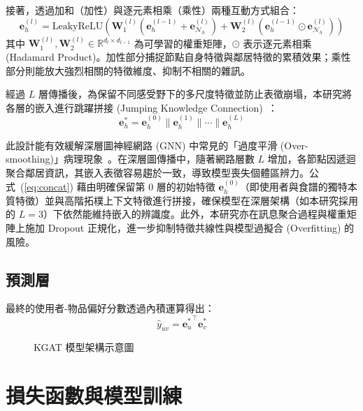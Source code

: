 接著，透過加和（加性）與逐元素相乘（乘性）兩種互動方式組合：
\begin{equation}
  \bm{e}_h^{(l)} = \text{LeakyReLU}\left(\bm{W}_1^{(l)} \left(\bm{e}_h^{(l-1)} + \bm{e}_{\mathcal{N}_h}^{(l)}\right) + \bm{W}_2^{(l)} \left(\bm{e}_h^{(l-1)} \odot \bm{e}_{\mathcal{N}_h}^{(l)}\right)\right)
  \label{eq:bi_interaction}
\end{equation}
其中 $\bm{W}_1^{(l)}, \bm{W}_2^{(l)} \in \mathbb{R}^{d_l \times d_{l-1}}$ 為可學習的權重矩陣，$\odot$ 表示逐元素相乘 (Hadamard Product)。加性部分捕捉節點自身特徵與鄰居特徵的累積效果；乘性部分則能放大強烈相關的特徵維度、抑制不相關的雜訊。

經過 $L$ 層傳播後，為保留不同感受野下的多尺度特徵並防止表徵崩塌，本研究將各層的嵌入進行跳躍拼接 (Jumping Knowledge Connection)~\cite{xu2018jumping}：
\begin{equation}
  \bm{e}_h^* = \bm{e}_h^{(0)} \| \bm{e}_h^{(1)} \| \cdots \| \bm{e}_h^{(L)}
  \label{eq:concat}
\end{equation}

此設計能有效緩解深層圖神經網路 (GNN) 中常見的「過度平滑 (Over-smoothing)」病理現象~\cite{li2018deeper}。在深層圖傳播中，隨著網路層數 $L$ 增加，各節點因遞迴聚合鄰居資訊，其嵌入表徵容易趨於一致，導致模型喪失個體區辨力。公式~(\ref{eq:concat}) 藉由明確保留第 0 層的初始特徵 $\bm{e}_h^{(0)}$（即使用者與食譜的獨特本質特徵）並與高階拓樸上下文特徵進行拼接，確保模型在深層架構（如本研究採用的 $L=3$）下依然能維持嵌入的辨識度。此外，本研究亦在訊息聚合過程與權重矩陣上施加 Dropout 正規化，進一步抑制特徵共線性與模型過擬合 (Overfitting) 的風險。

\subsection*{預測層}

最終的使用者-物品偏好分數透過內積運算得出：
\begin{equation}
  \hat{y}_{uv} = {\bm{e}_u^*}^\top \bm{e}_v^*
  \label{eq:prediction}
\end{equation}

\begin{figure}[htbp]
  \centering
  
  \caption{KGAT 模型架構示意圖}
  \label{fig:kgat_architecture}
\end{figure}

\section{損失函數與模型訓練}

